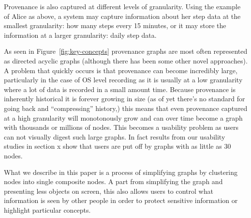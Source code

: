 Provenance is also captured at different levels of granularity. Using the example of Alice as above, a system may capture information about her step data at the smallest granularity: how many steps every 15 minutes, or it may store the information at a larger granularity: daily step data.

As seen in Figure~\ref{fig:key-concepts} provenance graphs are most often represented as directed acyclic graphs
(although there has been some other novel approaches). A problem that quickly occurs is that provenance can become incredibly large, particularly in the case of OS level recording as it is usually at a low granularity where a lot of data is recorded in a small amount time. Because provenance is inherently historical it is forever growing in size (as of yet there's no standard for going back and ``compressing'' history,) this means that even provenance captured at a high granularity will monotonously grow and can over time become a graph with thousands or millions of nodes. This becomes a
usability problem as users can not visually digest such large graphs. In fact results from our usability studies in section x show that users are put off by graphs with as little as 30 nodes.

What we describe in this paper is a process of simplifying graphs by clustering nodes into single composite nodes. A part from simplifying the graph and presenting less objects on screen, this also allows users to control what information is seen by other people in order to protect sensitive information or highlight particular concepts.
